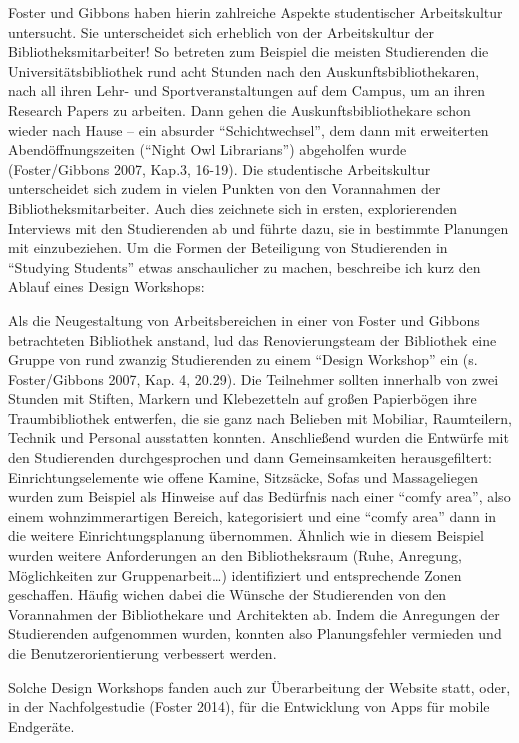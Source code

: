 \documentclass[a4paper,
fontsize=11pt,
oneside,
numbers=noperiodatend,
parskip=half-,
bibliography=totoc,
final
]{scrartcl}
\begin{document}
Foster und Gibbons haben hierin zahlreiche Aspekte studentischer
Arbeitskultur untersucht. Sie unterscheidet sich erheblich von der
Arbeitskultur der Bibliotheksmitarbeiter! So betreten zum Beispiel die
meisten Studierenden die Universitätsbibliothek rund acht Stunden nach
den Auskunftsbibliothekaren, nach all ihren Lehr- und
Sportveranstaltungen auf dem Campus, um an ihren Research Papers zu
arbeiten. Dann gehen die Auskunftsbibliothekare schon wieder nach Hause
-- ein absurder \enquote{Schichtwechsel}, dem dann mit erweiterten
Abendöffnungszeiten (\enquote{Night Owl Librarians}) abgeholfen wurde
(Foster/Gibbons 2007, Kap.3, 16-19). Die studentische Arbeitskultur
unterscheidet sich zudem in vielen Punkten von den Vorannahmen der
Bibliotheksmitarbeiter. Auch dies zeichnete sich in ersten,
explorierenden Interviews mit den Studierenden ab und führte dazu, sie
in bestimmte Planungen mit einzubeziehen. Um die Formen der Beteiligung
von Studierenden in \enquote{Studying Students} etwas anschaulicher zu
machen, beschreibe ich kurz den Ablauf eines Design Workshops:

Als die Neugestaltung von Arbeitsbereichen in einer von Foster und
Gibbons betrachteten Bibliothek anstand, lud das Renovierungsteam der
Bibliothek eine Gruppe von rund zwanzig Studierenden zu einem
\enquote{Design Workshop} ein (s. Foster/Gibbons 2007, Kap. 4, 20.29).
Die Teilnehmer sollten innerhalb von zwei Stunden mit Stiften, Markern
und Klebezetteln auf großen Papierbögen ihre Traumbibliothek entwerfen,
die sie ganz nach Belieben mit Mobiliar, Raumteilern, Technik und
Personal ausstatten konnten. Anschließend wurden die Entwürfe mit den
Studierenden durchgesprochen und dann Gemeinsamkeiten herausgefiltert:
Einrichtungselemente wie offene Kamine, Sitzsäcke, Sofas und
Massageliegen wurden zum Beispiel als Hinweise auf das Bedürfnis nach
einer \enquote{comfy area}, also einem wohnzimmerartigen Bereich,
kategorisiert und eine \enquote{comfy area} dann in die weitere
Einrichtungsplanung übernommen. Ähnlich wie in diesem Beispiel wurden
weitere Anforderungen an den Bibliotheksraum (Ruhe, Anregung,
Möglichkeiten zur Gruppenarbeit\ldots{}) identifiziert und entsprechende
Zonen geschaffen. Häufig wichen dabei die Wünsche der Studierenden von
den Vorannahmen der Bibliothekare und Architekten ab. Indem die
Anregungen der Studierenden aufgenommen wurden, konnten also
Planungsfehler vermieden und die Benutzerorientierung verbessert werden.

Solche Design Workshops fanden auch zur Überarbeitung der Website statt,
oder, in der Nachfolgestudie (Foster 2014), für die Entwicklung von Apps
für mobile Endgeräte.
\end{document}

